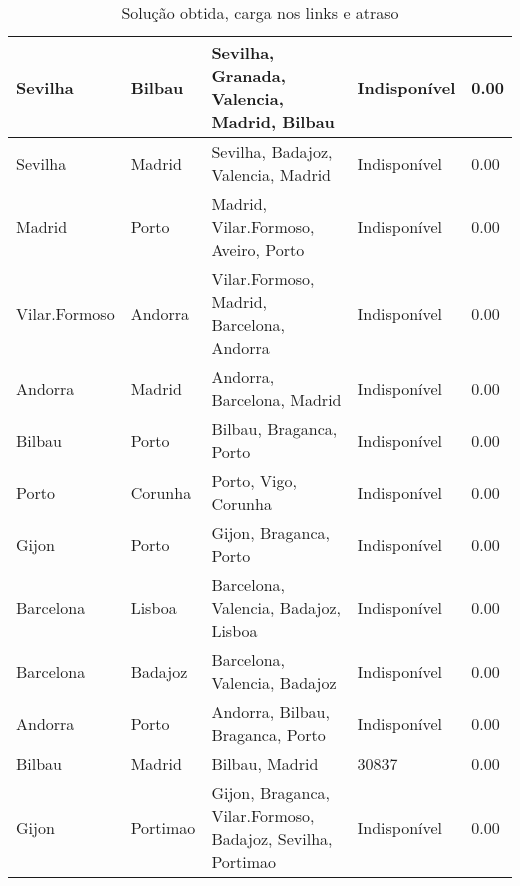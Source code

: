 \begin{table}[!htb]
{\begin{tabular}{|l|l|l|l|l|}
Sevilha & Bilbau & Sevilha, Granada, Valencia, Madrid, Bilbau & Indisponível & 0.00 \\ \hline
Sevilha & Madrid & Sevilha, Badajoz, Valencia, Madrid & Indisponível & 0.00 \\ \hline
Madrid & Porto & Madrid, Vilar.Formoso, Aveiro, Porto & Indisponível & 0.00 \\ \hline
Vilar.Formoso & Andorra & Vilar.Formoso, Madrid, Barcelona, Andorra & Indisponível & 0.00 \\ \hline
Andorra & Madrid & Andorra, Barcelona, Madrid & Indisponível & 0.00 \\ \hline
Bilbau & Porto & Bilbau, Braganca, Porto & Indisponível & 0.00 \\ \hline
Porto & Corunha & Porto, Vigo, Corunha & Indisponível & 0.00 \\ \hline
Gijon & Porto & Gijon, Braganca, Porto & Indisponível & 0.00 \\ \hline
Barcelona & Lisboa & Barcelona, Valencia, Badajoz, Lisboa & Indisponível & 0.00 \\ \hline
Barcelona & Badajoz & Barcelona, Valencia, Badajoz & Indisponível & 0.00 \\ \hline
Andorra & Porto & Andorra, Bilbau, Braganca, Porto & Indisponível & 0.00 \\ \hline
Bilbau & Madrid & Bilbau, Madrid & 30837 & 0.00 \\ \hline
Gijon & Portimao & Gijon, Braganca, Vilar.Formoso, Badajoz, Sevilha, Portimao & Indisponível & 0.00 \\ \hline
\end{tabular}}
\caption[]{Solução obtida, carga nos links e atraso}
\end{table}

